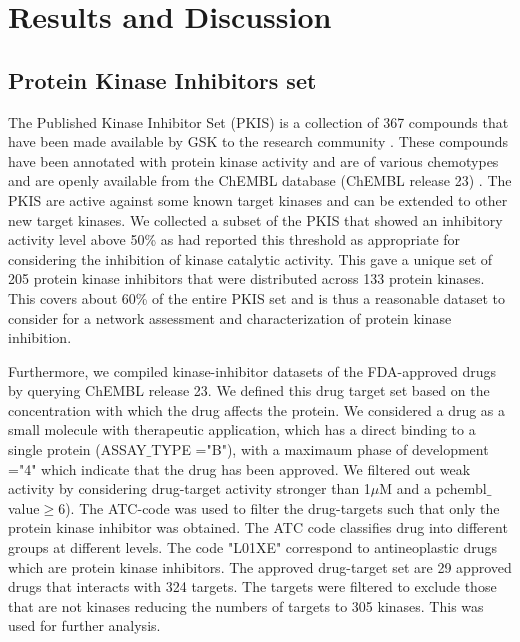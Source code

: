\documentclass[a4paper, 11pt]{article}
\begin{document}
\section*{Results and Discussion}
\subsection*{Protein Kinase Inhibitors set}
The Published Kinase Inhibitor Set (PKIS) is a collection of 367 compounds that have been made available by GSK to the research community \cite{dranchak2013profile, knapp2013public}. These compounds have been annotated with protein kinase  activity \cite{knapp2013public} and are of various chemotypes and are openly available from the ChEMBL database (ChEMBL release 23) \cite{gaulton2016chembl}. The PKIS are active against some known target kinases and can be extended to other new target kinases. We collected a subset of the PKIS that showed an inhibitory activity level above 50\% as \cite{dranchak2013profile,  anastassiadis2011comprehensive} had reported this threshold as appropriate for considering the inhibition of kinase catalytic activity. This gave a unique set of 205 protein kinase inhibitors that were distributed across 133 protein kinases. This covers about 60\% of the entire PKIS set and is thus a reasonable dataset to consider for a network assessment and characterization of protein kinase inhibition.\par
Furthermore, we compiled kinase-inhibitor datasets of the FDA-approved drugs by querying ChEMBL release 23. We defined this drug target set based on the concentration with which the drug affects the protein. We considered a drug as a small molecule with therapeutic application, which has a direct binding to a single protein (ASSAY$\_$TYPE ="B"), with a maximaum phase of development ="4" which indicate that the drug has been approved. We filtered out weak activity by considering drug-target activity stronger than 1$\mu$M and a pchembl$\_$value$\geq$6). The ATC-code was used to filter the drug-targets such that only the protein kinase inhibitor was obtained. The ATC code classifies drug into different groups at different levels. The code "L01XE" correspond to antineoplastic drugs which are protein kinase inhibitors. The approved drug-target set are 29 approved drugs that interacts with 324 targets. The targets were filtered to exclude those that are not kinases reducing the numbers of targets to 305 kinases. This was used for further analysis.
\end{document}
